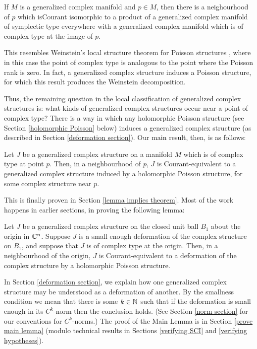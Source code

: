 \documentclass{article}
\begin{document}
\begin{thm}
If $M$ is a generalized complex manifold and $p\in M$, then there is a neighourhood of $p$ which isCourant isomorphic to a product of a generalized complex manifold of symplectic type everywhere with a generalized complex manifold which is of complex type at the image of $p$.
\end{thm}

This resembles Weinstein's local structure theorem for Poisson structures \cite{Weinstein}, where in this case the point of complex type is analogous to the point where the Poisson rank is zero.  In fact, a generalized complex structure induces a Poisson structure, for which this result produces the Weinstein decomposition.

Thus, the remaining question in the local classification of generalized complex structures is: what kinds of generalized complex structures occur near a point of complex type?  There is a way in which any holomorphic Poisson structure (see Section \ref{holomorphic Poisson} below) induces a generalized complex structure (as described in Section \ref{deformation section}).  Our main result, then, is as follows:

\begin{main thm}
Let $J$ be a generalized complex structure on a manifold $M$ which is of complex type at point $p$.  Then, in a neighbourhood of $p$, $J$ is Courant-equivalent to a generalized complex structure induced by a holomorphic Poisson structure, for some complex structure near $p$.
\end{main thm}

This is finally proven in Section \ref{lemma implies theorem}.  Most of the work happens in earlier sections, in proving the following lemma:

\begin{main lem}
Let $J$ be a generalized complex structure on the closed unit ball $B_1$ about the origin in $\mathbb C^n$.  Suppose $J$ is a small enough deformation of the complex structure on $B_1$, and suppose that $J$ is of complex type at the origin.  Then, in a neighbourhood of the origin, $J$ is Courant-equivalent to a deformation of the complex structure by a holomorphic Poisson structure.
\end{main lem}

In Section \ref{deformation section}, we explain how one generalized complex structure may be understood as a deformation of another.  By the smallness condition we mean that there is some $k\in\mathbb N$ such that if the deformation is small enough in its $C^k$-norm then the conclusion holds.  (See Section \ref{norm section} for our conventions for $C^k$-norms.)  The proof of the Main Lemma is in Section \ref{prove main lemma} (modulo technical results in Sections \ref{verifying SCI} and \ref{verifying hypotheses}).
\end{document}
